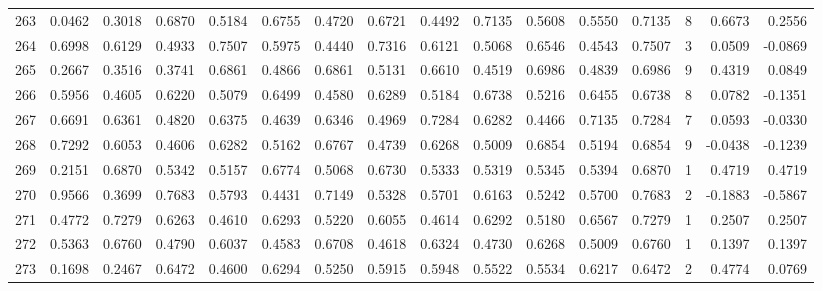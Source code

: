 \begin{tabular}{lrrrrrrrrrrrrrrr}
263 &      0.0462 &  0.3018 &  0.6870 &  0.5184 &  0.6755 &  0.4720 &  0.6721 &  0.4492 &  0.7135 &  0.5608 &   0.5550 &     0.7135 &      8 &                    0.6673 &                     0.2556 \\
264 &      0.6998 &  0.6129 &  0.4933 &  0.7507 &  0.5975 &  0.4440 &  0.7316 &  0.6121 &  0.5068 &  0.6546 &   0.4543 &     0.7507 &      3 &                    0.0509 &                    -0.0869 \\
265 &      0.2667 &  0.3516 &  0.3741 &  0.6861 &  0.4866 &  0.6861 &  0.5131 &  0.6610 &  0.4519 &  0.6986 &   0.4839 &     0.6986 &      9 &                    0.4319 &                     0.0849 \\
266 &      0.5956 &  0.4605 &  0.6220 &  0.5079 &  0.6499 &  0.4580 &  0.6289 &  0.5184 &  0.6738 &  0.5216 &   0.6455 &     0.6738 &      8 &                    0.0782 &                    -0.1351 \\
267 &      0.6691 &  0.6361 &  0.4820 &  0.6375 &  0.4639 &  0.6346 &  0.4969 &  0.7284 &  0.6282 &  0.4466 &   0.7135 &     0.7284 &      7 &                    0.0593 &                    -0.0330 \\
268 &      0.7292 &  0.6053 &  0.4606 &  0.6282 &  0.5162 &  0.6767 &  0.4739 &  0.6268 &  0.5009 &  0.6854 &   0.5194 &     0.6854 &      9 &                   -0.0438 &                    -0.1239 \\
269 &      0.2151 &  0.6870 &  0.5342 &  0.5157 &  0.6774 &  0.5068 &  0.6730 &  0.5333 &  0.5319 &  0.5345 &   0.5394 &     0.6870 &      1 &                    0.4719 &                     0.4719 \\
270 &      0.9566 &  0.3699 &  0.7683 &  0.5793 &  0.4431 &  0.7149 &  0.5328 &  0.5701 &  0.6163 &  0.5242 &   0.5700 &     0.7683 &      2 &                   -0.1883 &                    -0.5867 \\
271 &      0.4772 &  0.7279 &  0.6263 &  0.4610 &  0.6293 &  0.5220 &  0.6055 &  0.4614 &  0.6292 &  0.5180 &   0.6567 &     0.7279 &      1 &                    0.2507 &                     0.2507 \\
272 &      0.5363 &  0.6760 &  0.4790 &  0.6037 &  0.4583 &  0.6708 &  0.4618 &  0.6324 &  0.4730 &  0.6268 &   0.5009 &     0.6760 &      1 &                    0.1397 &                     0.1397 \\
273 &      0.1698 &  0.2467 &  0.6472 &  0.4600 &  0.6294 &  0.5250 &  0.5915 &  0.5948 &  0.5522 &  0.5534 &   0.6217 &     0.6472 &      2 &                    0.4774 &                     0.0769 \\

\end{tabular}
